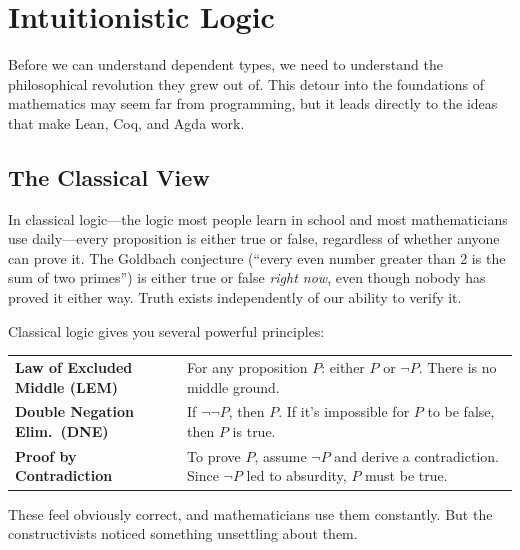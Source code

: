 \documentclass[11pt,a4paper]{article}
\theoremstyle{definition}
\begin{document}

\section{Intuitionistic Logic}\label{sec:intuitionistic-sec}

Before we can understand dependent types, we need to understand the
philosophical revolution they grew out of. This detour into the foundations of
mathematics may seem far from programming, but it leads directly to the ideas
that make Lean, Coq, and Agda work.


\subsection{The Classical View}

In classical logic---the logic most people learn in school and most
mathematicians use daily---every proposition is either true or false, regardless
of whether anyone can prove it. The Goldbach conjecture (``every even number
greater than 2 is the sum of two primes'') is either true or false \emph{right
now}, even though nobody has proved it either way. Truth exists independently
of our ability to verify it.

Classical logic gives you several powerful principles:

\begin{center}
\renewcommand{\arraystretch}{1.4}
\begin{tabular}{lp{8cm}}
\textbf{Law of Excluded Middle (LEM)} & For any proposition $P$: either $P$ or
  $\lnot P$. There is no middle ground. \\
\textbf{Double Negation Elim.\ (DNE)} & If $\lnot\lnot P$, then $P$. If it's
  impossible for $P$ to be false, then $P$ is true. \\
\textbf{Proof by Contradiction} & To prove $P$, assume $\lnot P$ and derive a
  contradiction. Since $\lnot P$ led to absurdity, $P$ must be true. \\
\end{tabular}
\end{center}

These feel obviously correct, and mathematicians use them constantly. But the
constructivists noticed something unsettling about them.
\end{document}

